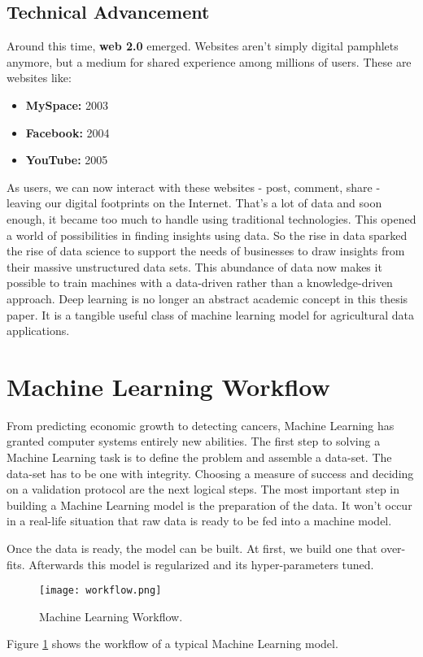 \subsection{Technical Advancement}
Around this time, \textbf{web 2.0} emerged. Websites aren't simply digital pamphlets anymore, but a medium for shared experience among millions of users. These are websites like:
\begin{itemize}
	\item \textbf{MySpace:} 2003
	\item \textbf{Facebook:} 2004
	\item \textbf{YouTube:} 2005	
\end{itemize}

As users, we can now interact with these websites - post, comment, share - leaving our digital footprints on the Internet. That's a lot of data and soon enough, it became too much to handle using traditional technologies. This opened a world of possibilities in finding insights using data. So the rise in data sparked the rise of data science to support the needs of businesses to draw insights from their massive unstructured data sets. This abundance of data now makes it possible to train machines with a data-driven rather than a knowledge-driven approach. Deep learning is no longer an abstract academic concept in this thesis paper. It is a tangible useful class of machine learning model for agricultural data applications.

\section{Machine Learning Workflow}
From predicting economic growth to detecting cancers, Machine Learning has granted computer systems entirely new abilities. The first step to solving a Machine Learning task is to define the problem and assemble a data-set. The data-set has to be one with integrity. Choosing a measure of success and deciding on a validation protocol are the next logical steps. The most important step in building a Machine Learning model is the preparation of the data. It won't occur in a real-life situation that raw data is ready to be fed into a machine model. 

Once the data is ready, the model can be built. At first, we build one that over-fits. Afterwards this model is regularized and its hyper-parameters tuned. 

\begin{figure}[h!]
	\texttt{[image: workflow.png]}
	\caption{Machine Learning Workflow.\protect\cite{division_2000, charfeddine2020reviewing, krose1993introduction}}
	\label{fig:workflow}
\end{figure}

Figure \ref{fig:workflow} shows the workflow of a typical Machine Learning model.
